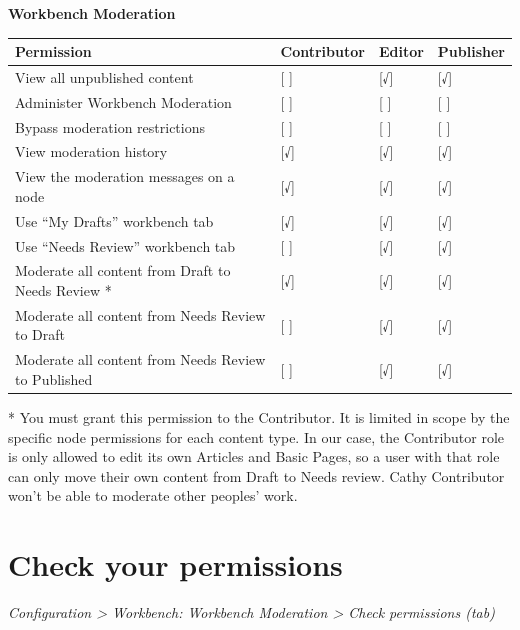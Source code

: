\documentclass[letterpaper,10pt,english]{sphinxmanual}
\begin{document}
\textbf{Workbench Moderation}

\begin{tabulary}{\linewidth}{|L|L|L|L|}
\hline
\textbf{
Permission
} & \textbf{
Contributor
} & \textbf{
Editor
} & \textbf{
Publisher
}\\\hline

View all unpublished content
 & 
{[} {]}
 & 
{[}√{]}
 & 
{[}√{]}
\\\hline

Administer Workbench Moderation
 & 
{[} {]}
 & 
{[} {]}
 & 
{[} {]}
\\\hline

Bypass moderation restrictions
 & 
{[} {]}
 & 
{[} {]}
 & 
{[} {]}
\\\hline

View moderation history
 & 
{[}√{]}
 & 
{[}√{]}
 & 
{[}√{]}
\\\hline

View the moderation messages on a node
 & 
{[}√{]}
 & 
{[}√{]}
 & 
{[}√{]}
\\\hline

Use ``My Drafts'' workbench tab
 & 
{[}√{]}
 & 
{[}√{]}
 & 
{[}√{]}
\\\hline

Use ``Needs Review'' workbench tab
 & 
{[} {]}
 & 
{[}√{]}
 & 
{[}√{]}
\\\hline

Moderate all content from Draft to Needs Review *
 & 
{[}√{]}
 & 
{[}√{]}
 & 
{[}√{]}
\\\hline

Moderate all content from  Needs Review to Draft
 & 
{[} {]}
 & 
{[}√{]}
 & 
{[}√{]}
\\\hline

Moderate all content from Needs Review to Published
 & 
{[} {]}
 & 
{[}√{]}
 & 
{[}√{]}
\\\hline
\end{tabulary}


* You must grant this permission to the Contributor. It is limited in scope by the specific node permissions for each content type. In our case, the Contributor role is only allowed to edit its own Articles and Basic Pages, so a user with that role can only move their own content from Draft to Needs review. Cathy Contributor won't be able to moderate other peoples' work.


\section{Check your permissions}
\label{moderation:check-your-permissions}
\emph{Configuration \textgreater{} Workbench: Workbench Moderation \textgreater{} Check permissions (tab)}
\end{document}
